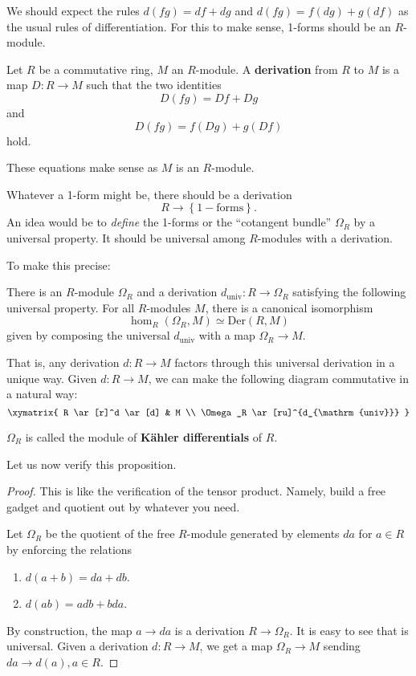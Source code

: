 We should expect the rules $d(fg)= df+dg$ and $d(fg) = f(dg) + g(df)$ as the
usual rules of differentiation. For this to make sense, 1-forms should be an
$R$-module. 

\begin{definition} 
Let $R$ be a commutative ring, $M$ an $R$-module. A \textbf{derivation} from
$R$ to $M$ is a map $D: R \to M$ such that the two identities
\[ D(fg)= Df + Dg  \]
and
\[ D(fg) = f(Dg) + g(Df)  \]
hold.
\end{definition} 
These equations make sense as $M$ is an $R$-module.

Whatever a 1-form might be, there should be a derivation
\[ R \to \left\{\mathrm{1-forms}\right\}.  \]
An idea would be to \emph{define} the 1-forms or the ``cotangent bundle''
$\Omega_R$ by a
universal property. It should be universal among $R$-modules with a derivation.

To make this precise:
\begin{proposition} 
There is an $R$-module $\Omega_R$ and a derivation $d_{\mathrm{univ}} : R \to
\Omega_R$ satisfying the following universal property. For all $R$-modules
$M$, there is a canonical isomorphism 
\[ \hom_{R}(\Omega_R, M) \simeq \mathrm{Der}(R, M)  \]
given by composing the universal $d_{\mathrm{univ}}$ with a map $\Omega_R \to M$.
\end{proposition} 

That is, any derivation $d: R \to M$ factors through this universal derivation
in a unique way. Given $d: R \to M$, we can make the following diagram
commutative in a natural way:
\[ 
\xymatrix{
R \ar[r]^d \ar[d]  &  M \\
\Omega_R \ar[ru]^{d_{\mathrm{univ}}}
}
\]

\begin{definition} 
$\Omega_R$ is called the module of \textbf{K\"ahler differentials} of $R$.
\end{definition} 

Let us now verify this proposition.
\begin{proof} 
This is like the verification of the tensor product. Namely, build a free
gadget and quotient out by whatever you need.

Let $\Omega_R$ be the quotient of the free $R$-module generated by elements
$da$ for $a \in R$ by enforcing the relations
\begin{enumerate}
\item $d(a+b) =da + db$. 
\item $d(ab) = adb + bda$.
\end{enumerate}
By construction, the map $a \to da$ is a derivation $R \to \Omega_R$. 
It is easy to see that is universal. Given a derivation $d: R \to M$, we get a
map $\Omega_R \to M$ sending $da \to d(a), a \in R$.
\end{proof} 

